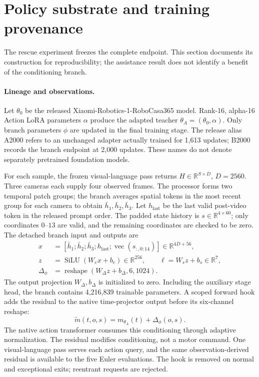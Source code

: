 \section{Policy substrate and training provenance}
\label{s:substrate}
The rescue experiment freezes the complete endpoint. This section documents its construction for reproducibility; the assistance result does not identify a benefit of the conditioning branch.

\paragraph{Lineage and observations.}
Let $\theta_0$ be the released Xiaomi-Robotics-1-RoboCasa365 model. Rank-16, alpha-16 Action LoRA parameters $\alpha$ produce the adapted teacher $\theta_A=(\theta_0,\alpha)$. Only branch parameters $\phi$ are updated in the final training stage. The release alias A2000 refers to an unchanged adapter actually trained for 1,613 updates; B2000 records the branch endpoint at 2,000 updates. These names do not denote separately pretrained foundation models.

For each sample, the frozen visual-language pass returns $H\in\mathbb R^{S\times D}$, $D=2560$. Three cameras each supply four observed frames. The processor forms two temporal patch groups; the branch averages spatial tokens in the most recent group for each camera to obtain $\bar h_1,\bar h_2,\bar h_3$. Let $h_{\mathrm{last}}$ be the last valid post-video token in the released prompt order. The padded state history is $s\in\mathbb R^{4\times 60}$; only coordinates $0$--$13$ are valid, and the remaining coordinates are checked to be zero. The detached branch input and outputs are
\begin{align}
x&=[\bar h_1;\bar h_2;\bar h_3;h_{\mathrm{last}};
       \operatorname{vec}(s_{:,0:14})]\in\mathbb R^{4 D+56},\label{s:eq:input}\\
z&=\operatorname{SiLU}(W_e x+b_e)\in\mathbb R^{256},\qquad
\ell=W_s z+b_s\in\mathbb R^7,\\
\Delta_\phi&=\operatorname{reshape}(W_\Delta z+b_\Delta,6,1024).
\end{align}
The output projection $W_\Delta,b_\Delta$ is initialized to zero. Including the auxiliary stage head, the branch contains 4,216,839 trainable parameters. A scoped forward hook adds the residual to the native time-projector output before its six-channel reshape:
\begin{equation}
\widetilde m(t,o,s)=m_{\theta_A}(t)+\Delta_\phi(o,s).
\end{equation}
The native action transformer consumes this conditioning through adaptive normalization. The residual modifies conditioning, not a motor command. One visual-language pass serves each action query, and the same observation-derived residual is available to the five Euler evaluations. The hook is removed on normal and exceptional exits; reentrant requests are rejected.

